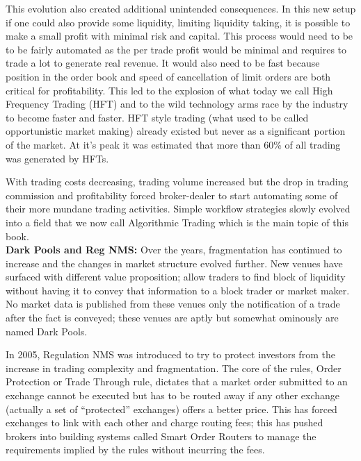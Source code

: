 This evolution also created additional unintended consequences. In this new setup if one could also provide some liquidity, limiting liquidity taking, it is possible to make a small profit with minimal risk and capital. This process would need to be to be fairly automated as the per trade profit would be minimal and requires to trade a lot to generate real revenue. It would also need to be fast because position in the order book and speed of cancellation of limit orders are both critical for profitability. This led to the explosion of what today we call High Frequency Trading (HFT) and to the wild technology arms race by the industry to become faster and faster. HFT style trading (what used to be called opportunistic market making) already existed but never as a significant portion of the market. At it's peak it was estimated that more than 60\% of all trading was generated by HFTs.


With trading costs decreasing, trading volume increased but the drop in trading commission and profitability forced broker-dealer to start automating some of their more mundane trading activities. Simple workflow strategies slowly evolved into a field that we now call Algorithmic Trading which is the main topic of this book. \\


\noindent\textbf{Dark Pools and Reg NMS:} Over the years, fragmentation has continued to increase and the changes in market structure evolved further. New venues have surfaced with different value proposition; allow traders to find block of liquidity without having it to convey that information to a block trader or market maker. No market data is published from these venues only the notification of a trade after the fact is conveyed; these venues are aptly but somewhat ominously are named Dark Pools.


In 2005, Regulation NMS was introduced to try to protect investors from the increase in trading complexity and fragmentation. The core of the rules, Order Protection or Trade Through rule, dictates that a market order submitted to an exchange cannot be executed but has to be routed away if any other exchange (actually a set of ``protected'' exchanges) offers a better price. This has forced exchanges to link with each other and charge routing fees; this has pushed brokers into building systems called Smart Order Routers to manage the requirements implied by the rules without incurring the fees. \\



